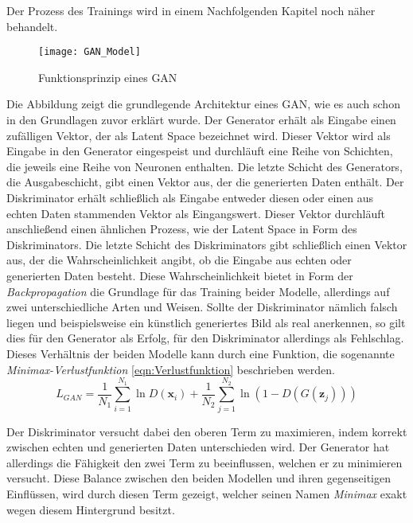 \noindent Der Prozess des Trainings wird in einem Nachfolgenden Kapitel noch näher behandelt. 

\newpage

\begin{figure}[h]
    \centering
    \texttt{[image: GAN\_Model]}
    \caption{Funktionsprinzip eines \ac{GAN}}
    \label{Abb:basic}
    \end{figure}

    \noindent Die Abbildung zeigt die grundlegende Architektur eines \ac{GAN}, wie es auch schon in den Grundlagen zuvor erklärt wurde. Der Generator erhält als Eingabe einen zufälligen Vektor, der als Latent Space bezeichnet wird. Dieser Vektor wird als Eingabe in den Generator eingespeist und durchläuft eine Reihe von Schichten, die jeweils eine Reihe von Neuronen enthalten. Die letzte Schicht des Generators, die Ausgabeschicht, gibt einen Vektor aus, der die generierten Daten enthält. Der Diskriminator erhält schließlich als Eingabe entweder diesen oder einen aus echten Daten stammenden Vektor als Eingangswert. Dieser Vektor durchläuft anschließend einen ähnlichen Prozess, wie der Latent Space in Form des Diskriminators. Die letzte Schicht des Diskriminators gibt schließlich einen Vektor aus, der die Wahrscheinlichkeit angibt, ob die Eingabe aus echten oder generierten Daten besteht. Diese Wahrscheinlichkeit bietet in Form der \textit{Backpropagation} die Grundlage für das Training beider Modelle, allerdings auf zwei unterschiedliche Arten und Weisen. Sollte der Diskriminator nämlich falsch liegen und beispielsweise ein künstlich generiertes Bild als real anerkennen, so gilt dies für den Generator als Erfolg, für den Diskriminator allerdings als Fehlschlag. Dieses Verhältnis der beiden Modelle kann durch eine Funktion, die sogenannte \textit{Minimax-Verlustfunktion} \ref{eqn:Verlustfunktion} beschrieben werden.\\

    \begin{equation}
        \label{eqn:Verlustfunktion}
        L_{GAN}=\frac{1}{N_1}\sum_{i=1}^{N_1} \ln{D (\textbf{x}_i)} + \frac{1}{N_2}\sum_{j=1}^{N_2} \ln{(1-D (G (\textbf{z}_j)))}
        \end{equation}

    \noindent Der Diskriminator versucht dabei den oberen Term zu maximieren, indem korrekt zwischen echten und generierten Daten unterschieden wird. Der Generator hat allerdings die Fähigkeit den zwei Term zu beeinflussen, welchen er zu minimieren versucht. Diese Balance zwischen den beiden Modellen und ihren gegenseitigen Einflüssen, wird durch diesen Term gezeigt, welcher seinen Namen \textit{Minimax} exakt wegen diesem Hintergrund besitzt. 

    
    

\newpage